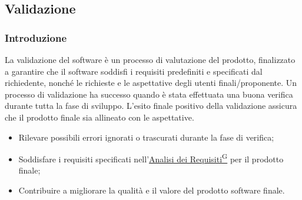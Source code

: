 \subsection{Validazione}
\subsubsection{Introduzione}
La validazione del software è un processo di valutazione del prodotto, finalizzato a garantire che il 
software soddisfi i requisiti predefiniti e specificati dal richiedente, nonché le richieste e le aspettative 
degli utenti finali/proponente. Un processo di validazione ha successo quando è stata effettuata una buona 
verifica durante tutta la fase di sviluppo.
L’esito finale positivo della validazione assicura che il prodotto finale sia allineato con le aspettative.
\begin{itemize}
    \item Rilevare possibili errori ignorati o trascurati durante la fase di verifica;
    \item Soddisfare i requisiti specificati nell’\href{https://code7crusaders.github.io/docs/RTB/documentazione_interna/glossario.html#analisi-dei-requisiti}{Analisi dei Requisiti\textsuperscript{G}} per il prodotto finale;
    \item Contribuire a migliorare la qualità e il valore del prodotto software finale.
\end{itemize}


